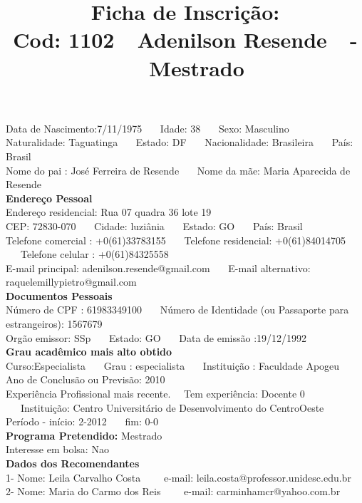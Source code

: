 \documentclass[11pt]{article}
\title{\vspace*{-4cm} Ficha de Inscrição: \\Cod: 1102\ \ Adenilson  Resende\ \ - \ \ Mestrado 
 }
\date{}
\begin{document}
\maketitle
\vspace*{-1.5cm}
\noindent Data de Nascimento:7/11/1975
\ \ \ Idade: 38   \ \ \ Sexo: Masculino
\\
Naturalidade: Taguatinga   
\ \ \  Estado: DF
\ \ \  Nacionalidade: Brasileira
\ \ \ País: Brasil
\\        
Nome do pai : José Ferreira de Resende
\ \ \ Nome da mãe: Maria Aparecida de Resende          
\\[0.2cm]                     
\textbf{Endereço Pessoal} 
\\ 
\noindent Endereço residencial: Rua 07 quadra 36 lote 19
\\
        CEP: 72830-070 
\ \ \ Cidade: luziânia 
\ \ \ Estado: GO 
\ \ \ País: Brasil
\\		
		Telefone comercial : +0(61)33783155
\ \ \ Telefone residencial: +0(61)84014705
\ \ \ Telefone celular : +0(61)84325558
\\
E-mail principal: adenilson.resende@gmail.com
\ \ \ E-mail alternativo: raquelemillypietro@gmail.com 
\\[0.2cm] 
\textbf{Documentos Pessoais}
\\
\noindent Número de CPF : 61983349100
\ \ \ Número de Identidade (ou Passaporte para estrangeiros): 1567679
\\
Orgão emissor: SSp
\ \ \ Estado: GO
\ \ \ Data de emissão :19/12/1992
\\[0.3cm]
\textbf{Grau acadêmico mais alto obtido}
\\	
Curso:Especialista
\ \ \ Grau : especialista
\ \ \ Instituição : Faculdade Apogeu
\\			
Ano de Conclusão ou Previsão: 2010
\\ 
Experiência Profissional mais recente. \ \  
Tem experiência: Docente 0  
\ \ \ Instituição: Centro Universitário de Desenvolvimento do CentroOeste
\\  
Período - início: 2-2012
\ \ \ fim: 0-0
\\[0.2cm] 
\textbf{Programa Pretendido:} Mestrado\\
Interesse em bolsa: Nao
\\[0.3cm]		
\textbf{Dados dos Recomendantes} 
\\
1- Nome: Leila Carvalho Costa
\ \ \ \  e-mail: leila.costa@professor.unidesc.edu.br 
\\
2- Nome: Maria do Carmo dos Reis
\ \ \ \ e-mail: carminhamcr@yahoo.com.br
\end{document}
